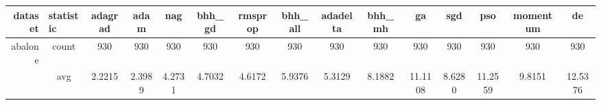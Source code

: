\begin{table}[htbp]
{\begin{tabular}{rcccc|c|c|c|c|c|ccccc}
			\cmidrule{3-3}\cmidrule{6-6}\cmidrule{8-8}\cmidrule{10-10}    \textbf{dataset} & \multicolumn{1}{l}{\textbf{statistic}} & \textbf{adagrad}                                                                   & \textbf{adam}                                                             & \textbf{nag}                                                              & \textbf{bhh\_gd}                               & \textbf{rmsprop}                                                          & \textbf{bhh\_all}                            & \textbf{adadelta}                           & \textbf{bhh\_mh}                               & \textbf{ga}                                    & \textbf{sgd}                                    & \textbf{pso}                                    & \textbf{momentum}                              & \textbf{de}                                    \\
			\midrule
			abalone                                                                        & count                                  & 930                                                                                & 930                                                                       & 930                                                                       & 930                                            & 930                                                                       & 930                                          & 930                                         & 930                                            & 930                                            & 930                                             & 930                                             & 930                                            & 930                                            \\
			                                                                               & avg                                    & \cellcolor[rgb]{ .776,  .937,  .808}\textcolor[rgb]{ 0,  .38,  0}{2.2215}          & 2.3989                                                                    & 4.2731                                                                    & 4.7032                                         & 4.6172                                                                    & 5.9376                                       & 5.3129                                      & 8.1882                                         & 11.1108                                        & 8.6280                                          & 11.2559                                         & 9.8151                                         & 12.5376                                        \\

\end{tabular}}
\end{table}
